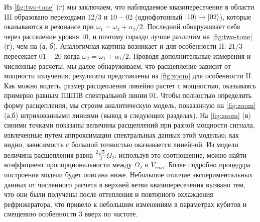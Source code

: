 \documentclass[14pt, a4paper]{extreport}
\DeclarePairedDelimiter\ket{\lvert}{\rangle}
\numberwithin{equation}{section}
\begin{document}
Из \autoref{fig:two-tone} (г) мы заключаем, что наблюдаемое квазипересечение в области III образовано переходами 12/3 и $ 10-02 $ (однофотонный $\ket{10}\rightarrow\ket{02}$), которые оказываются в резонансе при $\omega_1 = \omega_2 + \alpha_2/2$. Последний обнаруживает себя через расселение уровня 10, и поэтому гораздо лучше различим на \autoref{fig:two-tone} (г), чем на (а, б). Аналогичная картина возникает и для особенности II: 21/3 пересекает $ 01-20 $ когда $\omega_2 = \omega_1 + \alpha_1/2$. Проводя дополнительные измерения и численные расчеты, мы далее обнаруживаем, что расщепление зависит от мощности излучения; результаты представлены на \autoref{fig:zoom} для особенности II. Как можно видеть, размер расщепления линейно растет с мощностью, оказываясь примерно равным ПШПВ спектральной линии 01. Чтобы полностью определить форму расщепления, мы строим аналитическую модель, показанную на \autoref{fig:zoom} (а,б) штрихованными линиями (вывод в следующих разделах). На \autoref{fig:zoom} (в) синими точками показаны величины расщеплений при разной мощности сигнала, извлеченные путем аппроксимации спектральных данных этой моделью; как видно, зависимость с большой точностью оказывается линейной. Из модели величина расщепления равна $\frac{2\sqrt{3}}{3} \Omega_2$: используя это соотношение, можно найти коэффициент пропорциональности между $\Omega_2$ и $V_{rms}$. Более подробно процедура построения модели будет описана ниже. Небольшое отличие экспериментальных данных от численного расчета в верхней ветви квазипересечения вызвано тем, что они были получены после оттепления и повторного охлаждения рефрижератора, что привело к небольшим изменениям в параметрах кубитов и смещению особенности 3 вверх по частоте.
\end{document}

